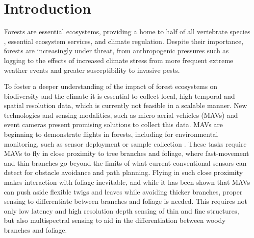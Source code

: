 \section{Introduction}
\label{sec:intro}


Forests are essential ecosystems, providing a home to half of all vertebrate species \cite{Pillay2022}, essential ecosystem services, and climate regulation\cite{Brockerhoff2017}. 
Despite their importance, forests are increasingly under threat, from anthropogenic pressures such as logging to the effects of increased climate stress from more frequent extreme weather events and greater susceptibility to invasive pests\cite{FAO2020a}.




To foster a deeper understanding of the impact of forest ecosystems on biodiversity and the climate it is essential to collect local, high temporal and spatial resolution data, which is currently not feasible in a scalable manner. New technologies and sensing modalities, such as micro aerial vehicles (MAVs) and event cameras present promising solutions to collect this data. MAVs are beginning to demonstrate flights in forests\cite{Loquercio2021, Liu2022}, including for environmental monitoring, such as sensor deployment \cite{Geckeler2022,  Geckeler2023b} or sample collection \cite{Aucone2023a, Charron2020}. These tasks require MAVs to fly in close proximity to tree branches and foliage, where fast-movement and thin branches go beyond the limits of what current conventional sensors can detect for obstacle avoidance and path planning. 
Flying in such close proximity makes interaction with foliage inevitable, and while it has been shown that MAVs can push aside flexible twigs and leaves while avoiding thicker branches\cite{Aucone2024}, proper sensing to differentiate between branches and foliage is needed\cite{Geckeler2024}. This requires not only low latency and high resolution depth sensing of thin and fine structures, but also multispectral sensing to aid in the differentiation between woody branches and foliage.

